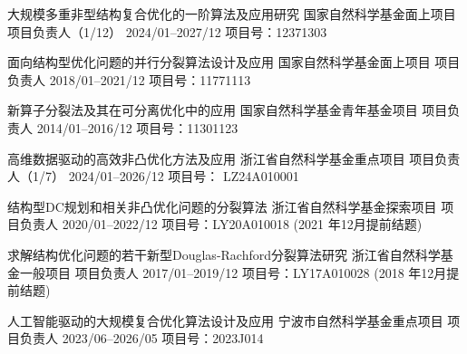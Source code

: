 
\begin{cventries}
  \cventry
    {大规模多重非型结构复合优化的一阶算法及应用研究} %
    {国家自然科学基金面上项目} %
    {项目负责人（1/12）} %
    {2024/01--2027/12} %
    {项目号：12371303 }

\cventry
{面向结构型优化问题的并行分裂算法设计及应用} %
{国家自然科学基金面上项目} %
{项目负责人} %
{2018/01--2021/12} %
{项目号：11771113}

\cventry
{新算子分裂法及其在可分离优化中的应用} %
{国家自然科学基金青年基金项目} %
{项目负责人} %
{2014/01--2016/12} %
{项目号：11301123}

\cventry
{高维数据驱动的高效非凸优化方法及应用} %
{ 浙江省自然科学基金重点项目} %
{项目负责人（1/7）} %
{2024/01--2026/12} %
{项目号： LZ24A010001}

\cventry
{结构型DC规划和相关非凸优化问题的分裂算法} %
{浙江省自然科学基金探索项目} %
{项目负责人} %
{2020/01--2022/12} %
{项目号：LY20A010018 (2021 年12月提前结题)}

\cventry
{求解结构优化问题的若干新型Douglas-Rachford分裂算法研究} %
{浙江省自然科学基金一般项目} %
{项目负责人} %
{2017/01--2019/12} %
{项目号：LY17A010028 (2018 年12月提前结题)}

 \cventry
 {人工智能驱动的大规模复合优化算法设计及应用} %
 {宁波市自然科学基金重点项目} %
 {项目负责人} %
 {2023/06--2026/05} %
 {项目号：2023J014}
 

\end{cventries}
